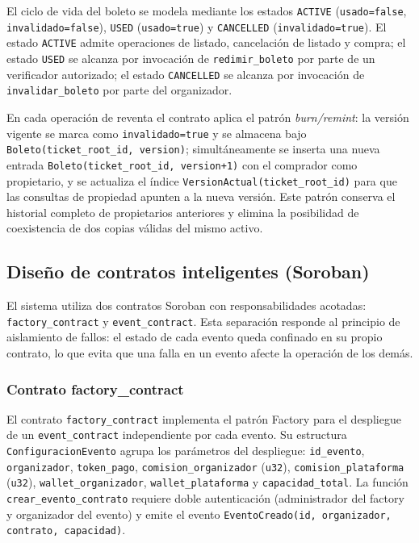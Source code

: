 El ciclo de vida del boleto se modela mediante los estados \texttt{ACTIVE} (\texttt{usado=false}, \texttt{invalidado=false}), \texttt{USED} (\texttt{usado=true}) y \texttt{CANCELLED} (\texttt{invalidado=true}). El estado \texttt{ACTIVE} admite operaciones de listado, cancelación de listado y compra; el estado \texttt{USED} se alcanza por invocación de \texttt{redimir\_boleto} por parte de un verificador autorizado; el estado \texttt{CANCELLED} se alcanza por invocación de \texttt{invalidar\_boleto} por parte del organizador.

En cada operación de reventa el contrato aplica el patrón \textit{burn/remint}: la versión vigente se marca como \texttt{invalidado=true} y se almacena bajo \texttt{Boleto(ticket\_root\_id, version)}; simultáneamente se inserta una nueva entrada \texttt{Boleto(ticket\_root\_id, version+1)} con el comprador como propietario, y se actualiza el índice \texttt{VersionActual(ticket\_root\_id)} para que las consultas de propiedad apunten a la nueva versión. Este patrón conserva el historial completo de propietarios anteriores y elimina la posibilidad de coexistencia de dos copias válidas del mismo activo.

\subsection{Diseño de contratos inteligentes (Soroban)}

El sistema utiliza dos contratos Soroban con responsabilidades acotadas: \texttt{factory\_contract} y \texttt{event\_contract}. Esta separación responde al principio de aislamiento de fallos: el estado de cada evento queda confinado en su propio contrato, lo que evita que una falla en un evento afecte la operación de los demás.

\subsubsection{Contrato factory\_contract}

El contrato \texttt{factory\_contract} implementa el patrón Factory para el despliegue de un \texttt{event\_contract} independiente por cada evento. Su estructura \texttt{ConfiguracionEvento} agrupa los parámetros del despliegue: \texttt{id\_evento}, \texttt{organizador}, \texttt{token\_pago}, \texttt{comision\_organizador} (\texttt{u32}), \texttt{comision\_plataforma} (\texttt{u32}), \texttt{wallet\_organizador}, \texttt{wallet\_plataforma} y \texttt{capacidad\_total}. La función \texttt{crear\_evento\_contrato} requiere doble autenticación (administrador del factory y organizador del evento) y emite el evento \texttt{EventoCreado(id, organizador, contrato, capacidad)}.


